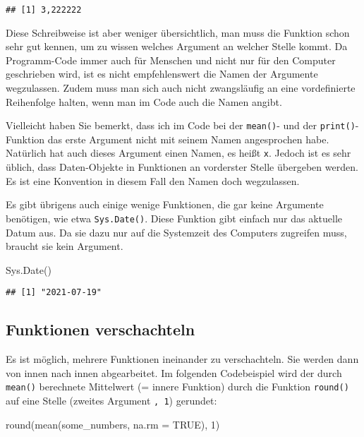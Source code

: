 \documentclass[
]{book}
\newenvironment{Shaded}{\begin{snugshade}}{\end{snugshade}}
\newcommand{\AttributeTok}[1]{\textcolor[rgb]{0.77,0.63,0.00}{#1}}
\newcommand{\ConstantTok}[1]{\textcolor[rgb]{0.00,0.00,0.00}{#1}}
\newcommand{\DecValTok}[1]{\textcolor[rgb]{0.00,0.00,0.81}{#1}}
\newcommand{\FunctionTok}[1]{\textcolor[rgb]{0.00,0.00,0.00}{#1}}
\newcommand{\NormalTok}[1]{#1}
\begin{document}
\begin{verbatim}
## [1] 3,222222
\end{verbatim}

Diese Schreibweise ist aber weniger übersichtlich, man muss die Funktion schon sehr gut kennen, um zu wissen welches Argument an welcher Stelle kommt. Da Programm-Code immer auch für Menschen und nicht nur für den Computer geschrieben wird, ist es nicht empfehlenswert die Namen der Argumente wegzulassen. Zudem muss man sich auch nicht zwangsläufig an eine vordefinierte Reihenfolge halten, wenn man im Code auch die Namen angibt.

Vielleicht haben Sie bemerkt, dass ich im Code bei der \texttt{mean()}- und der \texttt{print()}-Funktion das erste Argument nicht mit seinem Namen angesprochen habe. Natürlich hat auch dieses Argument einen Namen, es heißt \texttt{x}. Jedoch ist es sehr üblich, dass Daten-Objekte in Funktionen an vorderster Stelle übergeben werden. Es ist eine Konvention in diesem Fall den Namen doch wegzulassen.

Es gibt übrigens auch einige wenige Funktionen, die gar keine Argumente benötigen, wie etwa \texttt{Sys.Date()}. Diese Funktion gibt einfach nur das aktuelle Datum aus. Da sie dazu nur auf die Systemzeit des Computers zugreifen muss, braucht sie kein Argument.

\begin{Shaded}
\begin{Highlighting}[]
\FunctionTok{Sys.Date}\NormalTok{()}
\end{Highlighting}
\end{Shaded}

\begin{verbatim}
## [1] "2021-07-19"
\end{verbatim}

\hypertarget{funktionen-verschachteln}{%
\subsection{Funktionen verschachteln}\label{funktionen-verschachteln}}

Es ist möglich, mehrere Funktionen ineinander zu verschachteln. Sie werden dann von innen nach innen abgearbeitet. Im folgenden Codebeispiel wird der durch \texttt{mean()} berechnete Mittelwert (= innere Funktion) durch die Funktion \texttt{round()} auf eine Stelle (zweites Argument \texttt{,\ 1}) gerundet:

\begin{Shaded}
\begin{Highlighting}[]
\FunctionTok{round}\NormalTok{(}\FunctionTok{mean}\NormalTok{(some\_numbers, }\AttributeTok{na.rm =} \ConstantTok{TRUE}\NormalTok{), }\DecValTok{1}\NormalTok{)}
\end{Highlighting}
\end{Shaded}
\end{document}
